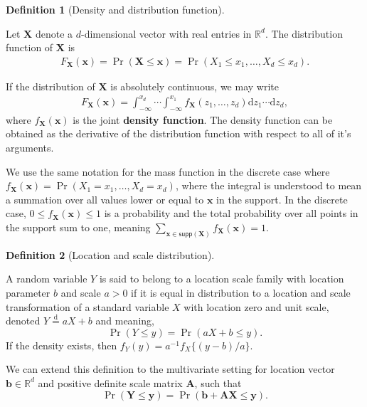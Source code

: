\documentclass[
  11pt,
  letterpaper,
]{scrbook}
\theoremstyle{definition}
\theoremstyle{plain}
\theoremstyle{plain}
\theoremstyle{definition}
\theoremstyle{definition}
\newtheorem{definition}{Definition}[chapter]
\theoremstyle{remark}
\begin{document}
\begin{definition}[Density and distribution
function]\protect\hypertarget{def-cdf}{}\label{def-cdf}

Let \(\boldsymbol{X}\) denote a \(d\)-dimensional vector with real
entries in \(\mathbb{R}^d\). The distribution function of
\(\boldsymbol{X}\) is \begin{align*}
 F_{\boldsymbol{X}}(\boldsymbol{x}) = \Pr(\boldsymbol{X} \leq \boldsymbol{x}) = \Pr(X_1 \leq x_1, \ldots, X_d \leq x_d).
\end{align*}

If the distribution of \(\boldsymbol{X}\) is absolutely continuous, we
may write \begin{align*}
 F_{\boldsymbol{X}}(\boldsymbol{x}) = \int_{-\infty}^{x_d} \cdots \int_{-\infty}^{x_1} f_{\boldsymbol{X}}(z_1, \ldots, z_d) \mathrm{d} z_1 \cdots \mathrm{d} z_d,
\end{align*} where \(f_{\boldsymbol{X}}(\boldsymbol{x})\) is the joint
\textbf{density function}. The density function can be obtained as the
derivative of the distribution function with respect to all of it's
arguments.

We use the same notation for the mass function in the discrete case
where
\(f_{\boldsymbol{X}}(\boldsymbol{x}) = \Pr(X_1 = x_1, \ldots, X_d = x_d)\),
where the integral is understood to mean a summation over all values
lower or equal to \(\boldsymbol{x}\) in the support. In the discrete
case, \(0 \leq f_{\boldsymbol{X}}(\boldsymbol{x}) \leq 1\) is a
probability and the total probability over all points in the support sum
to one, meaning
\(\sum_{\boldsymbol{x} \in \mathsf{supp}(\boldsymbol{X})} f_{\boldsymbol{X}}(\boldsymbol{x}) = 1.\)

\end{definition}

\begin{definition}[Location and scale
distribution]\protect\hypertarget{def-location-scale}{}\label{def-location-scale}

A random variable \(Y\) is said to belong to a location scale family
with location parameter \(b\) and scale \(a>0\) if it is equal in
distribution to a location and scale transformation of a standard
variable \(X\) with location zero and unit scale, denoted
\(Y \stackrel{\mathrm{d}}{=} aX + b\) and meaning,
\[\Pr(Y \leq y) = \Pr(aX + b \leq y).\] If the density exists, then
\(f_Y(y) = a^{-1}f_X\{(y-b)/a\}\).

We can extend this definition to the multivariate setting for location
vector \(\boldsymbol{b} \in \mathbb{R}^d\) and positive definite scale
matrix \(\mathbf{A}\), such that
\[\Pr(\boldsymbol{Y} \leq \boldsymbol{y}) = \Pr(\boldsymbol{b} + \mathbf{A}\boldsymbol{X} \leq \boldsymbol{y}).\]

\end{definition}
\end{document}

